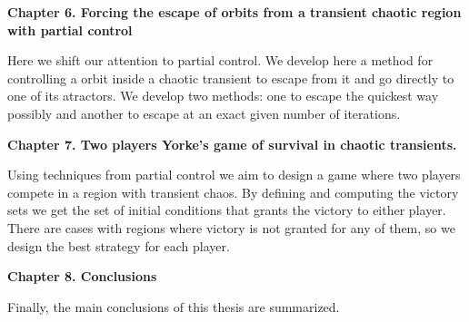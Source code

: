 \vspace{0.6cm}

{\bf  Chapter 6. Forcing the escape of orbits from a transient chaotic region with partial control} 

\vspace{0.6cm}

Here we shift our attention to partial control. We develop here a method for controlling a orbit inside a chaotic transient to escape from it and go directly to one of its atractors. We develop two methods: one to escape the quickest way possibly and another to escape at an exact given number of iterations.

\vspace{0.6cm}


{\bf  Chapter 7. Two players Yorke's game of survival in chaotic transients.}

\vspace{0.6cm}

Using techniques from partial control we aim to design a game where two players compete in a region with transient chaos. By defining and computing the victory sets we get the set of initial conditions that grants the victory to either player. There are cases with regions where victory is not granted for any of them, so we design the best strategy for each player.


\vspace{0.6cm}

{\bf  Chapter 8. Conclusions}

\vspace{0.6cm}

Finally, the main conclusions of this thesis are summarized.